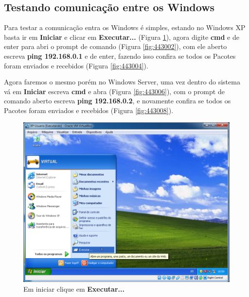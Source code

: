 \documentclass[10pt]{article}
\begin{document}
\subsection{Testando comunicação entre os Windows}
\par Para testar a comunicação entra os Windows é simples, estando no Windows XP basta ir em \textbf{Iniciar} e clicar em \textbf{Executar...} (Figura \ref{fig:443001}), agora digite \textbf{cmd} e de enter para abri o prompt de comando (Figura \ref{fig:443002}), com ele aberto escreva \textbf{ping 192.168.0.1} e de enter, fazendo isso confira se todos os Pacotes foram enviados e recebidos (Figura \ref{fig:443004}).
\par Agora faremos o mesmo porém no Windows Server, uma vez dentro do sistema vá em \textbf{Iniciar} escreva \textbf{cmd} e abra (Figura \ref{fig:443006}), com o prompt de comando aberto escreva \textbf{ping 192.168.0.2}, e novamente confira se todos os Pacotes foram enviados e recebidos (Figura \ref{fig:443008}).
\begin{figure}[H]
    \centering
    \caption{Em iniciar clique em \textbf{Executar...}}
    \label{fig:443001}
    \includegraphics[width=\linewidth]{images/xp_rede/testando_comunicação_entre_os_windows/001.png}
\end{figure}
\end{document}
